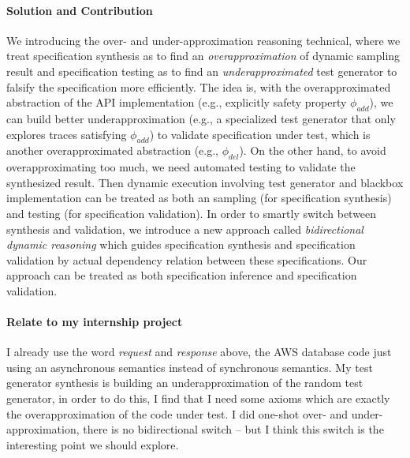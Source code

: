 \paragraph{Solution and Contribution} We introducing the over- and under-approximation reasoning technical, where we treat specification synthesis as to find an \emph{overapproximation} of dynamic sampling result and specification testing as to find an \emph{underapproximated} test generator to falsify the specification more efficiently. The idea is, with the overapproximated abstraction of the API implementation (e.g., explicitly safety property $\phi_{add}$), we can build better underapproximation (e.g., a specialized test generator that only explores traces satisfying $\phi_{add}$) to validate specification under test, which is another overapproximated abstraction (e.g., $\phi_{del}$). On the other hand, to avoid overapproximating too much, we need automated testing to validate the synthesized result. Then dynamic execution involving test generator and blackbox implementation can be treated as both an sampling (for specification synthesis) and testing (for specification validation). In order to smartly switch between synthesis and validation, we introduce a new approach called \emph{bidirectional dynamic reasoning} which guides specification synthesis and specification validation by actual dependency relation between these specifications. Our approach can be treated as both specification inference and specification validation.

\paragraph{Relate to my internship project} I already use the word \emph{request} and \emph{response} above, the AWS database code just using an asynchronous semantics instead of synchronous semantics. My test generator synthesis is building an underapproximation of the random test generator, in order to do this, I find that I need some axioms which are exactly the overapproximation of the code under test. I did one-shot over- and under-approximation, there is no bidirectional switch -- but I think this switch is the interesting point we should explore.